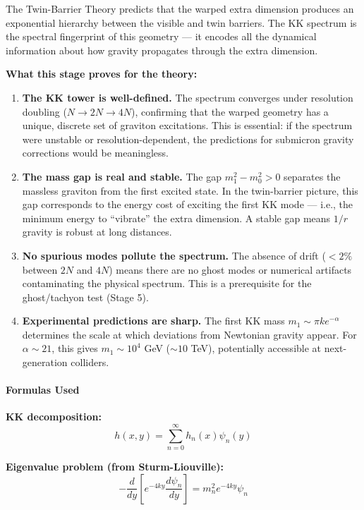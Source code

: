 \documentclass[
  11pt,
]{article}
\begin{document}
The Twin-Barrier Theory predicts that the warped extra dimension
produces an exponential hierarchy between the visible and twin barriers.
The KK spectrum is the spectral fingerprint of this geometry --- it
encodes all the dynamical information about how gravity propagates
through the extra dimension.

\textbf{What this stage proves for the theory:}

\begin{enumerate}
\def\labelenumi{\arabic{enumi}.}
\item
  \textbf{The KK tower is well-defined.} The spectrum converges under
  resolution doubling (\(N \to 2N \to 4N\)), confirming that the warped
  geometry has a unique, discrete set of graviton excitations. This is
  essential: if the spectrum were unstable or resolution-dependent, the
  predictions for submicron gravity corrections would be meaningless.
\item
  \textbf{The mass gap is real and stable.} The gap
  \(m_1^2 - m_0^2 > 0\) separates the massless graviton from the first
  excited state. In the twin-barrier picture, this gap corresponds to
  the energy cost of exciting the first KK mode --- i.e., the minimum
  energy to ``vibrate'' the extra dimension. A stable gap means \(1/r\)
  gravity is robust at long distances.
\item
  \textbf{No spurious modes pollute the spectrum.} The absence of drift
  (\(< 2\%\) between \(2N\) and \(4N\)) means there are no ghost modes
  or numerical artifacts contaminating the physical spectrum. This is a
  prerequisite for the ghost/tachyon test (Stage 5).
\item
  \textbf{Experimental predictions are sharp.} The first KK mass
  \(m_1 \sim \pi k e^{-\alpha}\) determines the scale at which
  deviations from Newtonian gravity appear. For \(\alpha \sim 21\), this
  gives \(m_1 \sim 10^4\) GeV (\(\sim 10\) TeV), potentially accessible
  at next-generation colliders.
\end{enumerate}

\bigskip

\hypertarget{formulas-used-3}{%
\paragraph{Formulas Used}\label{formulas-used-3}}

\textbf{KK decomposition:}
\[h(x, y) = \sum_{n=0}^{\infty} h_n(x)\psi_n(y) \tag{117}\]

\textbf{Eigenvalue problem (from Sturm-Liouville):}
\[-\frac{d}{dy}\left[e^{-4ky}\frac{d\psi_n}{dy}\right] = m_n^2 e^{-4ky}\psi_n \tag{118}\]
\end{document}
